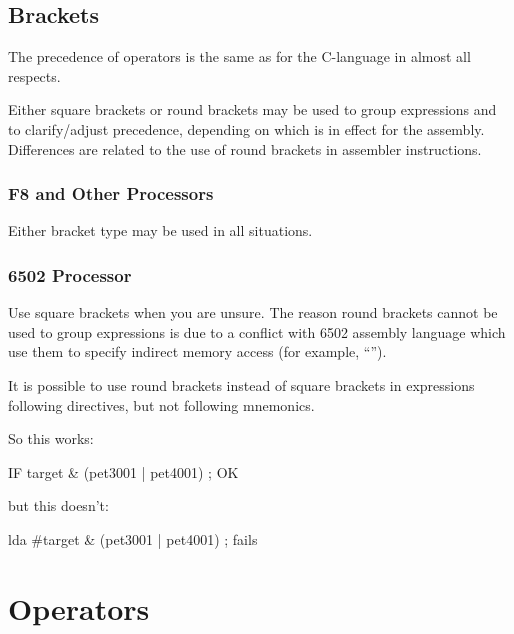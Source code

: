 \subsection{Brackets}
\label{changelog:20200908brackets}

The precedence of operators is the same as for the C-language in almost all respects.  

Either square brackets \mono{[]} or round brackets \mono{()} may be used to group expressions and to clarify/adjust precedence, depending on which  is in effect for the assembly. Differences are related to the use of round brackets in assembler instructions. 

\subsubsection{F8 and Other Processors}
Either bracket type may be used in all situations.

\subsubsection{6502 Processor}

Use square brackets \mono{[]} when you are unsure. The reason round brackets \mono{()} cannot be used to
group expressions is due to a conflict with 6502 assembly language which use them to specify indirect memory access (for example, ``'').

It is possible to use round brackets \mono{()} instead of square brackets \mono{[]} in expressions following directives, but not following mnemonics.

So this works:

\begin{code}[caption=Valid Bracket Usage]
    IF target & (pet3001 | pet4001) ; OK
\end{code}

but this doesn't:

\begin{code}[caption=Invalid Bracket Usage]
    lda #target & (pet3001 | pet4001) ; fails
\end{code}

\section{Operators}
	
